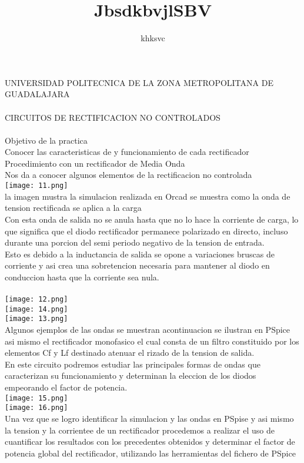 \documentclass[10pt,a4paper]{article}
\author{khksvc}
\title{JbsdkbvjlSBV}
\begin{document}
UNIVERSIDAD POLITECNICA DE LA ZONA METROPOLITANA DE GUADALAJARA
\\
\\


CIRCUITOS DE RECTIFICACION NO CONTROLADOS
\\
\\

Objetivo de la practica
\\
Conocer las caracteristicas de y funcionamiento de cada rectificador
\\
Procedimiento con un rectificador de Media Onda
\\
Nos da a conocer algunos elementos de la rectificacion no controlada
\\
\texttt{[image: 11.png]} 
\\

la imagen mustra la simulacion realizada en Orcad  se muestra como la onda de tension rectificada se aplica a la carga
\\
Con esta onda de salida no se anula hasta que no lo hace la corriente de carga, lo que significa que el diodo rectificador permanece polarizado en directo, incluso durante una porcion del semi periodo negativo de la tension de entrada.\\
Esto es debido a la inductancia de salida se opone a variaciones bruscas de corriente y asi crea una sobretencion necesaria para mantener al diodo en conduccion hasta que la corriente sea nula.\\
\\
\texttt{[image: 12.png]} 
\\
\texttt{[image: 14.png]} 
\\
\texttt{[image: 13.png]} 
\\
Algunos ejemplos de las ondas se muestran acontinuacion se ilustran en PSpice asi mismo el rectificador monofasico el cual consta de un filtro constituido por los elementos Cf y Lf destinado atenuar el rizado de la tension de salida.\\
En este circuito podremos estudiar las principales formas de ondas que caracterizan su funcionamiento y determinan la eleccion de los diodos empeorando el factor de potencia.
\\
\texttt{[image: 15.png]} 
\\
\texttt{[image: 16.png]} 
\\
Una vez que se logro identificar la simulacion y las ondas en PSpise y asi mismo la tension y la corrientee de un rectificador procedemos a realizar el uso de cuantificar los resultados con los precedentes obtenidos y determinar el factor de potencia global del rectificador, utilizando las herramientas del fichero de PSpice
\end{document}
